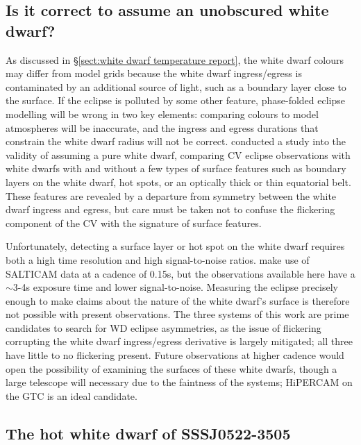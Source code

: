 \subsection{Is it correct to assume an unobscured white dwarf?}
\label{sect:impure white dwarf discussion}

As discussed in \S\ref{sect:white dwarf temperature report}, the white dwarf colours may differ from model grids because the white dwarf ingress/egress is contaminated by an additional source of light, such as a boundary layer close to the surface.
If the eclipse is polluted by some other feature, phase-folded eclipse modelling will be wrong in two key elements: comparing colours to model atmospheres will be inaccurate, and the ingress and egress durations that constrain the white dwarf radius will not be correct.
\citet{Spark2015} conducted a study into the validity of assuming a pure white dwarf, comparing CV eclipse observations with white dwarfs with and without a few types of surface features such as boundary layers on the white dwarf, hot spots, or an optically thick or thin equatorial belt.
These features are revealed by a departure from symmetry between the white dwarf ingress and egress, but care must be taken not to confuse the flickering component of the CV with the signature of surface features.

Unfortunately, detecting a surface layer or hot spot on the white dwarf requires both a high time resolution and high signal-to-noise ratios. \citet{Spark2015} make use of SALTICAM data at a cadence of 0.15s, but the observations available here have a $\sim$3-4s exposure time and lower signal-to-noise. Measuring the eclipse precisely enough to make claims about the nature of the white dwarf's surface is therefore not possible with present observations.
The three systems of this work are prime candidates to search for WD eclipse asymmetries, as the issue of flickering corrupting the white dwarf ingress/egress derivative is largely mitigated; all three have little to no flickering present.
Future observations at higher cadence would open the possibility of examining the surfaces of these white dwarfs, though a large telescope will necessary due to the faintness of the systems; HiPERCAM on the GTC is an ideal candidate.


\subsection{The hot white dwarf of SSSJ0522-3505}
\label{sect:SSSJ0522-3505 white dwarf temperature discussion}

